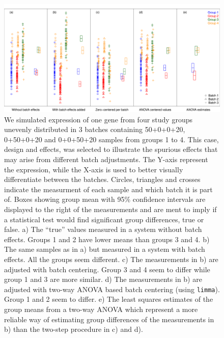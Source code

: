 \documentclass{bio}
\begin{document}
\begin{figure}[!p]
\centering\includegraphics[width=13cm]{Fig/boxplots.pdf}
\caption{We simulated expression of one gene from four study groups unevenly distributed in 3 batches containing 50+0+0+20, 0+50+0+20 and 0+0+50+20 samples from groups 1 to 4. This case, design and effects, was selected to illustrate the spurious effects that may arise from different batch adjustments. The Y-axis represent the expression, while the X-axis is used to better visually differentiate between the batches. Circles, triangles and crosses indicate the measurment of each sample and which batch it is part of. Boxes showing group mean with 95\% confidence intervals are displayed to the right of the measurements and are ment to imply if a statistical test would find significant group differences, true or false.
a) The ``true'' values measured in a system without batch effects. Groups 1 and 2 have lower means than groups 3 and 4.
b) The same samples as in a) but measured in a system with batch effects. All the groups seem different.
c) The measurements in b) are adjusted with batch centering. Group 3 and 4 seem to differ while group 1 and 3 are more similar.
d) The measurements in b) are adjusted with two-way ANOVA based batch centering (using \texttt{limma}). Group 1 and 2 seem to differ.
e) The least squares estimates of the group means from a two-way ANOVA which represent a more reliable way of estimating group differences of the measurements in b) than the two-step procedure in c) and d).
}
\label{fig:boxplots}
\end{figure}
\end{document}
